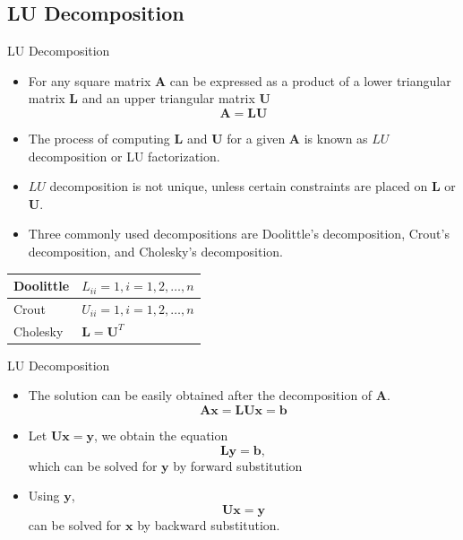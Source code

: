 \documentclass{beamer}
\newcommand{\beforeverb}{\footnotesize}
\newcommand{\afterverb}{\normalsize}
\begin{document}
\subsection[LU Decomposition]{LU Decomposition}
\begin{frame}{LU Decomposition}
\begin{itemize}
\item For any square matrix $\mathbf{A}$ can be expressed as a product of a \alert{lower triangular matrix} $\mathbf{ L}$ and an \alert{upper triangular matrix} $\mathbf{U}$
\[
\mathbf{A}=\mathbf{L}\mathbf{U}
\]
\item  The process of computing $\mathbf{L}$ and $\mathbf{U}$ for a given $\mathbf{A}$ is known as \alert{$LU$ decomposition} or \alert{LU factorization}.
\item $LU$ decomposition is \alert{not} unique, unless certain constraints are placed on $\mathbf{L}$ or $\mathbf{U}$. 
\item Three commonly used decompositions are Doolittle's decomposition, Crout's decomposition, and Cholesky's decomposition.
\end{itemize}
\begin{center}
\beforeverb
\begin{tabular}{|l|l|}
\hline
Doolittle & $L_{ii}=1, i=1,2,\ldots,n$\\
\hline
Crout & $U_{ii}=1, i=1,2,\ldots,n$\\
\hline
Cholesky & $\mathbf{L}=\mathbf{U}^{T}$\\
\hline
\end{tabular}
\afterverb
\end{center}
\end{frame}
\begin{frame}{LU Decomposition}
\begin{itemize}
\item The solution can be easily obtained after the decomposition of $\mathbf{A}$.
\[
\mathbf{Ax}=\mathbf{LUx}=\mathbf{b}
\]
\item Let $\mathbf{Ux}=\mathbf{y}$, we obtain the equation
\[
\mathbf{Ly}=\mathbf{b},
\] 
which can be solved for $\mathbf{y}$ by \alert{forward substitution}
\item  Using $\mathbf{y}$,
\[
\mathbf{Ux}=\mathbf{y}
\]
can be solved for $\mathbf{x}$ by \alert{backward substitution}. 
\end{itemize}
\end{frame}
\end{document}
